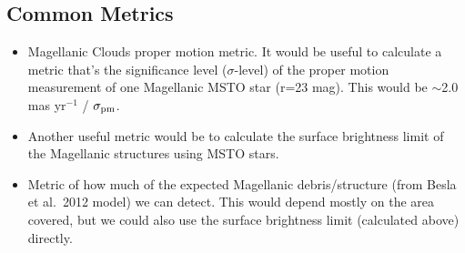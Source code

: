 \begin{enumerate}


\end{enumerate}


\subsection{Common Metrics}
\label{sec:\secname:metrics}



\begin{itemize}

\item  Magellanic Clouds proper motion metric.
It would be useful to calculate a metric that's the significance level ($\sigma$-level) of the proper motion measurement of one Magellanic MSTO star (r=23 mag).
This would be $\sim$2.0 mas yr$^{-1}$ / $\sigma_{\rm pm}$.

\item Another useful metric would be to calculate the surface
brightness limit of the Magellanic structures using MSTO stars.

\item Metric of how much of the expected Magellanic debris/structure
(from Besla et al.\ 2012 model) we can detect.  This would depend
mostly on the area covered, but we could also use the surface
brightness limit (calculated above) directly.

\end{itemize}





\navigationbar
